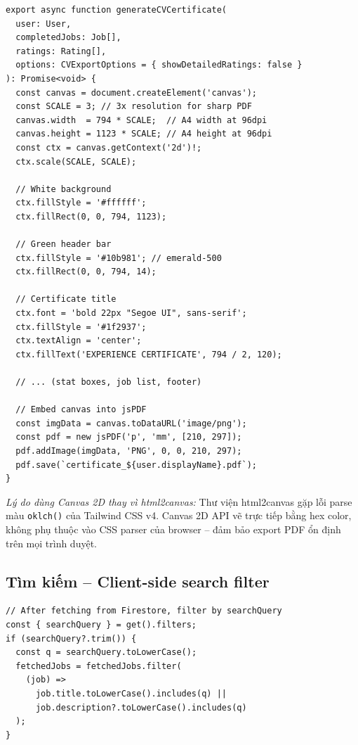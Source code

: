 \begin{lstlisting}[caption={cv.service.ts -- Canvas 2D PDF rendering (excerpt)}]
export async function generateCVCertificate(
  user: User,
  completedJobs: Job[],
  ratings: Rating[],
  options: CVExportOptions = { showDetailedRatings: false }
): Promise<void> {
  const canvas = document.createElement('canvas');
  const SCALE = 3; // 3x resolution for sharp PDF
  canvas.width  = 794 * SCALE;  // A4 width at 96dpi
  canvas.height = 1123 * SCALE; // A4 height at 96dpi
  const ctx = canvas.getContext('2d')!;
  ctx.scale(SCALE, SCALE);

  // White background
  ctx.fillStyle = '#ffffff';
  ctx.fillRect(0, 0, 794, 1123);

  // Green header bar
  ctx.fillStyle = '#10b981'; // emerald-500
  ctx.fillRect(0, 0, 794, 14);

  // Certificate title
  ctx.font = 'bold 22px "Segoe UI", sans-serif';
  ctx.fillStyle = '#1f2937';
  ctx.textAlign = 'center';
  ctx.fillText('EXPERIENCE CERTIFICATE', 794 / 2, 120);

  // ... (stat boxes, job list, footer)

  // Embed canvas into jsPDF
  const imgData = canvas.toDataURL('image/png');
  const pdf = new jsPDF('p', 'mm', [210, 297]);
  pdf.addImage(imgData, 'PNG', 0, 0, 210, 297);
  pdf.save(`certificate_${user.displayName}.pdf`);
}
\end{lstlisting}

\textit{Lý do dùng Canvas 2D thay vì html2canvas:} Thư viện html2canvas gặp lỗi parse
màu \texttt{oklch()} của Tailwind CSS v4. Canvas 2D API vẽ trực tiếp bằng hex color,
không phụ thuộc vào CSS parser của browser -- đảm bảo export PDF ổn định trên mọi
trình duyệt.

\subsection{Tìm kiếm -- Client-side search filter}

\begin{lstlisting}[caption={jobStore.ts -- Client-side search query filter}]
// After fetching from Firestore, filter by searchQuery
const { searchQuery } = get().filters;
if (searchQuery?.trim()) {
  const q = searchQuery.toLowerCase();
  fetchedJobs = fetchedJobs.filter(
    (job) =>
      job.title.toLowerCase().includes(q) ||
      job.description?.toLowerCase().includes(q)
  );
}
\end{lstlisting}

